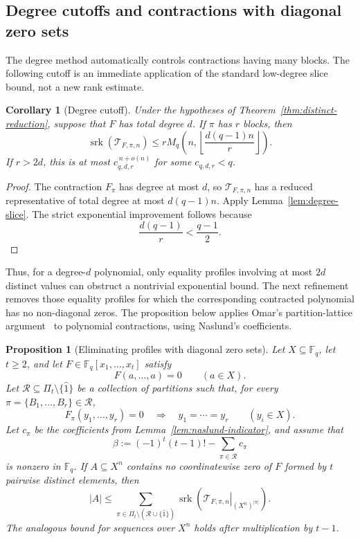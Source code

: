 \documentclass[10pt,a4paper]{amsart}
\newtheorem{proposition}[theorem]{Proposition}
\newtheorem{corollary}[theorem]{Corollary}
\theoremstyle{definition}
\newcommand{\F}{\mathbb F}
\newcommand{\srk}{\operatorname{srk}}
\newcommand{\1}{\mathbf 1}
\newcommand{\Tau}{\mathcal T}
\begin{document}
\subsection{\texorpdfstring{Degree cutoffs and contractions with diagonal zero sets}{Degree cutoffs and contractions with diagonal zero sets}}
The degree method automatically controls contractions having many blocks.  The following cutoff is an immediate application of the standard low-degree slice bound, not a new rank estimate.

\begin{corollary}[Degree cutoff]\label{cor:degree-cutoff}
Under the hypotheses of Theorem~\ref{thm:distinct-reduction}, suppose that $F$ has total degree $d$.  If $\pi$ has $r$ blocks, then
\[
 \srk(\Tau_{F,\pi,n})
 \le
 rM_q\left(n,\left\lfloor\frac{d(q-1)n}{r}\right\rfloor\right).
\]
If $r>2d$, this is at most $c_{q,d,r}^{\,n+o(n)}$ for some $c_{q,d,r}<q$.
\end{corollary}

\begin{proof}
The contraction $F_\pi$ has degree at most $d$, so $\Tau_{F,\pi,n}$ has a reduced representative of total degree at most $d(q-1)n$.  Apply Lemma~\ref{lem:degree-slice}.  The strict exponential improvement follows because
\[
 \frac{d(q-1)}r<\frac{q-1}{2}.
\]
\end{proof}

Thus, for a degree-$d$ polynomial, only equality profiles involving at most $2d$ distinct values can obstruct a nontrivial exponential bound.  {The next refinement removes those equality profiles for which the corresponding contracted polynomial has no non-diagonal zeros. The proposition below applies Omar's partition-lattice argument~\cite[Theorem~8]{OmarPartition} to polynomial contractions, using Naslund's coefficients.}

\begin{proposition}[{Eliminating profiles with diagonal zero sets}]\label{prop:diagonal-zero-refinement}
Let $X\subseteq\F_q$, let $t\ge2$, and let $F\in\F_q[x_1,\ldots,x_t]$ satisfy
\[
 F(a,\ldots,a)=0\qquad(a\in X).
\]
Let $\mathcal R\subseteq\Pi_t\setminus\{\widehat1\}$ be a collection of partitions such that, for every $\pi=\{B_1,\ldots,B_r\}\in\mathcal R$,
\[
 F_\pi(y_1,\ldots,y_r)=0
 \quad\Longrightarrow\quad
 y_1=\cdots=y_r
 \qquad(y_i\in X).
\]
Let $c_\pi$ be the coefficients from Lemma~\ref{lem:naslund-indicator}, and assume that
\[
 \beta:=(-1)^t(t-1)!-\sum_{\pi\in\mathcal R}c_\pi
\]
is nonzero in $\F_q$.  If $A\subseteq X^n$ contains no coordinatewise zero of $F$ formed by $t$ pairwise distinct elements, then
\[
 |A|\le
 \sum_{\pi\in\Pi_t\setminus(\mathcal R\cup\{\widehat1\})}
 \srk\!\left(\left.\Tau_{F,\pi,n}\right|_{(X^n)^{|\pi|}}\right).
\]
The analogous bound for sequences over $X^n$ holds after multiplication by $t-1$.
\end{proposition}
\end{document}
